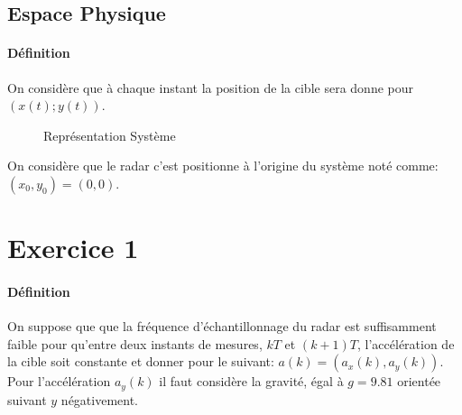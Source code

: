 \documentclass{article}
\begin{document}
\subsection*{Espace Physique}
\paragraph{Définition}On considère que à chaque instant la position de la cible sera donne pour $(x(t);y(t))$.

\begin{figure}[H]
    \centering
    \caption{Représentation Système}
\end{figure}
\noindent On considère que le radar c'est positionne à l'origine du système noté comme: $(x_{0}, y_{0}) = (0, 0)$.



\section{Exercice 1}
\paragraph{Définition}On suppose que que la fréquence d'échantillonnage du radar est suffisamment faible pour qu'entre deux instants de mesures, $kT$ et $(k+1)T$, l'accélération de la cible soit constante et donner pour le suivant: $a(k) = (a_{x}(k), a_{y}(k))$. Pour l'accélération $a_{y}(k)$ il faut considère la gravité, égal à $g = 9.81$ orientée suivant $y$ négativement.
\end{document}

